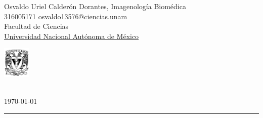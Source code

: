 

\pagestyle{fancy}
\fancyhf{}
\makeatletter
\def\@seccntformat#1{%
  \expandafter\ifx\csname c@#1\endcsname\c@section\else
  \csname the#1\endcsname\quad
  \fi}
\makeatother

\begin{flushleft}
Osvaldo Uriel Calderón Dorantes, \hfill Imagenología Biomédica\\
316005171 \hfill osvaldo13576@ciencias.unam  \\
Facultad de Ciencias\\
\underline{Universidad Nacional Autónoma de México}
\end{flushleft}

\begin{flushright}\vspace{-5mm}
\includegraphics[height=1.5cm]{style/logo.pdf}
\end{flushright}
 
\begin{center}\vspace{-1cm}
\textbf{ \large {}}\\
\today
\end{center}
\medskip\hrule\bigskip

